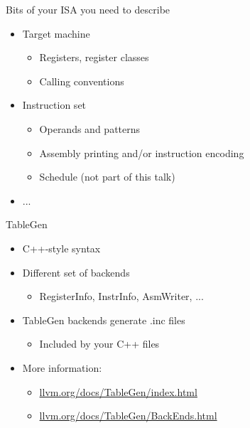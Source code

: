 
\begin{frame}{Bits of your ISA you need to describe}

\begin{itemize}
    \item Target machine
    \begin{itemize}
        \item Registers, register classes
        \item Calling conventions
    \end{itemize}
    \item Instruction set
    \begin{itemize}
        \item Operands and patterns
        \item Assembly printing and/or instruction encoding
        \item Schedule (not part of this talk)
    \end{itemize}
    \item ...
\end{itemize}

\end{frame}



\begin{frame}{TableGen}

\begin{itemize}
    \item C++-style syntax
    \item Different set of backends
    \begin{itemize}
        \item RegisterInfo, InstrInfo, AsmWriter, ...
    \end{itemize}
    \item TableGen backends generate .inc files
    \begin{itemize}
        \item Included by your C++ files
    \end{itemize}
    \item More information:
    \begin{itemize}
        \item \url{llvm.org/docs/TableGen/index.html}
        \item \url{llvm.org/docs/TableGen/BackEnds.html}
    \end{itemize}
\end{itemize}

\end{frame}

